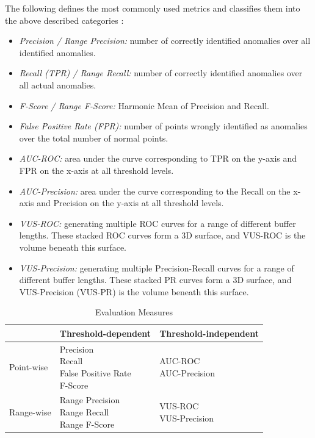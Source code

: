 \documentclass[12pt,oneside]{article}
\begin{document}
The following defines the most commonly used metrics and classifies them into the above described categories \parencites[p.2776-2780]{papaVus}:
\begin{itemize}
    \item \textit{Precision / Range Precision:} number of correctly identified anomalies over all identified anomalies.
    \item \textit{Recall (TPR) / Range Recall:} number of correctly identified anomalies over all actual anomalies.
    \item \textit{F-Score / Range F-Score:} Harmonic Mean of Precision and Recall.
    \item \textit{False Positive Rate (FPR):} number of points wrongly identified as anomalies over the total number of normal points.
    \item \textit{AUC-ROC:} area under the curve corresponding to TPR on the y-axis and FPR on the x-axis at all threshold levels.
    \item \textit{AUC-Precision:} area under the curve corresponding to the Recall on the x-axis and Precision on the y-axis at all threshold levels.
    \item \textit{VUS-ROC:} generating multiple ROC curves for a range of different buffer lengths. These stacked ROC curves form a 3D surface, and VUS-ROC is the volume beneath this surface.
    \item \textit{VUS-Precision:} generating multiple Precision-Recall curves for a range of different buffer lengths. These stacked PR curves form a 3D surface, and VUS-Precision (VUS-PR) is the volume beneath this surface.
\end{itemize}




\begin{table}[htbp]
  \centering
  \label{tab:evaluation_categories}

  \begin{tabular}{lll}
    \toprule
    & Threshold-dependent & Threshold-independent \\
    \midrule
    Point-wise & \makecell[l]{Precision \\ Recall \\ False Positive Rate \\ F-Score} & \makecell[l]{AUC-ROC \\ AUC-Precision} \\
    \midrule
    Range-wise & \makecell[l]{Range Precision \\ Range Recall \\ Range F-Score} & \makecell[l]{VUS-ROC \\ VUS-Precision} \\
    \bottomrule
  \end{tabular}
  \caption{Evaluation Measures}

\end{table}
\end{document}

